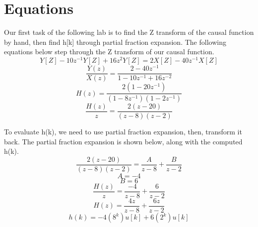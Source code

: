 \documentclass[12pt]{report}
\begin{document}
\section{Equations}
\hspace{\parindent}Our first task of the following lab is to find the Z transform of the causal function by hand, then find h[k] through partial fraction expansion. The following equations below step through the Z transform of our causal function.
\[Y[Z] - 10z^{-1}Y[Z]+16z^2Y[Z] = 2X[Z]-40z^{-1}X[Z]\]
\[\frac{Y(z)}{X(z)}=\frac{2-40z^{-1}}{1-10z^{-1}+16z^{-2}}\]
\[H(z) = \frac{2(1-20z^{-1})}{(1-8z^{-1})(1-2z^{-1})}\]
\[\frac{H(z)}{z} = \frac{2(z-20)}{(z-8)(z-2)}\]

\hspace{\parindent}To evaluate h(k), we need to use partial fraction expansion, then, transform it back. The partial fraction expansion is shown below, along with the computed h(k).
\[\frac{2(z-20)}{(z-8)(z-2)} = \frac{A}{z-8}+\frac{B}{z-2}\]
\[A = -4\]
\[B = 6\]
\[\frac{H(z)}{z} = \frac{-4}{z-8}+\frac{6}{z-2}\]
\[H(z) = \frac{4z}{z-8}+\frac{6z}{z-2}\]
\[h(k) = -4(8^k)u[k]+6(2^k)u[k]\]
\end{document}

